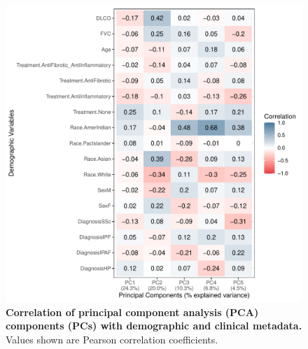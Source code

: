 \documentclass[
]{article}
\begin{document}
\begin{figure}

{\centering \includegraphics[width=0.8\linewidth,]{./Figures/BloodPilot/Figure E1 PCA metadata} 

}

\caption[Correlation of PCs with metadata (pilot study)]{\textbf{Correlation of principal component analysis (PCA) components (PCs) with demographic and clinical metadata.} Values shown are Pearson correlation coefficients.}\label{fig:pilotPCA}
\end{figure}
\end{document}
